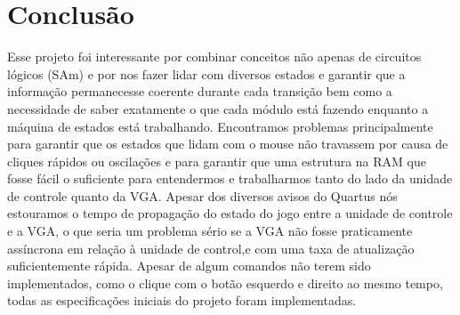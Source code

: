 \documentclass[12pt]{article}
\begin{document}
\section{Conclusão}
\label{sec:conclusion}

Esse projeto foi interessante por combinar conceitos não apenas de circuitos
lógicos (SAm) e por nos fazer lidar com diversos estados e garantir que a
informação permanecesse coerente durante cada transição bem como a necessidade
de saber exatamente o que cada módulo está fazendo enquanto a máquina de 
estados está trabalhando. Encontramos problemas principalmente para garantir
que os estados que lidam com o mouse não travassem por causa de cliques rápidos
ou oscilações e para garantir que uma estrutura na RAM que fosse fácil o 
suficiente para entendermos e trabalharmos tanto do lado da unidade de controle
quanto da VGA. Apesar dos diversos avisos do Quartus nós estouramos o tempo de
propagação do estado do jogo entre a unidade de controle e a VGA, o que seria
um problema sério se a VGA não fosse praticamente assíncrona em relação à
unidade de control,e com uma taxa de atualização suficientemente rápida.
Apesar de algum comandos não terem sido implementados, como o clique com o 
botão esquerdo e direito ao mesmo tempo, todas as especificações iniciais do
projeto foram implementadas.

\end{document}
